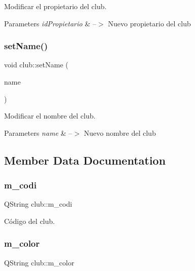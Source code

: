 Modificar el propietario del club. 


\begin{DoxyParams}{Parameters}
{\em id\+Propietario} & --$>$ Nuevo propietario del club \\
\hline
\end{DoxyParams}
\mbox{\label{classclub_a7c1e4e25822c9e54407dcad080e8c59a}} 
\subsubsection{\texorpdfstring{set\+Name()}{setName()}}
{\footnotesize\ttfamily void club\+::set\+Name (\begin{DoxyParamCaption}\item[{Q\+String}]{name }\end{DoxyParamCaption})}



Modificar el nombre del club. 


\begin{DoxyParams}{Parameters}
{\em name} & --$>$ Nuevo nombre del club \\
\hline
\end{DoxyParams}


\subsection{Member Data Documentation}
\mbox{\label{classclub_ade18982a1b4b4a30ca9317bd9490dd7d}} 
\subsubsection{\texorpdfstring{m\+\_\+codi}{m\_codi}}
{\footnotesize\ttfamily Q\+String club\+::m\+\_\+codi\hspace{0.3cm}{\ttfamily [private]}}

Código del club. \mbox{\label{classclub_ae8238bd2abbdd6fef94f03c2d7c846b1}} 
\subsubsection{\texorpdfstring{m\+\_\+color}{m\_color}}
{\footnotesize\ttfamily Q\+String club\+::m\+\_\+color\hspace{0.3cm}{\ttfamily [private]}}

